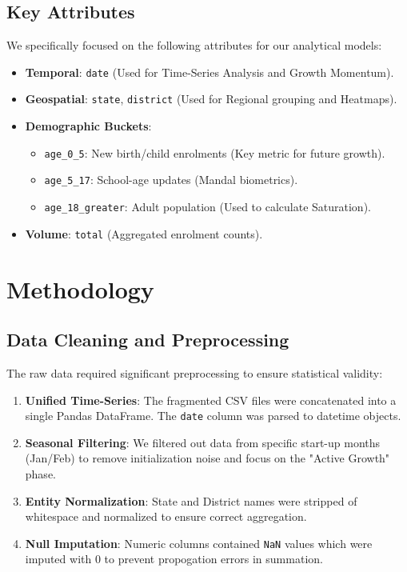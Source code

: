 \documentclass[12pt, a4paper]{article}
\begin{document}
\subsection{Key Attributes}
We specifically focused on the following attributes for our analytical models:
\begin{itemize}
    \item \textbf{Temporal}: \texttt{date} (Used for Time-Series Analysis and Growth Momentum).
    \item \textbf{Geospatial}: \texttt{state}, \texttt{district} (Used for Regional grouping and Heatmaps).
    \item \textbf{Demographic Buckets}:
    \begin{itemize}
        \item \texttt{age\_0\_5}: New birth/child enrolments (Key metric for future growth).
        \item \texttt{age\_5\_17}: School-age updates (Mandal biometrics).
        \item \texttt{age\_18\_greater}: Adult population (Used to calculate Saturation).
    \end{itemize}
    \item \textbf{Volume}: \texttt{total} (Aggregated enrolment counts).
\end{itemize}

\section{Methodology}

\subsection{Data Cleaning and Preprocessing}
The raw data required significant preprocessing to ensure statistical validity:
\begin{enumerate}
    \item \textbf{Unified Time-Series}: The fragmented CSV files were concatenated into a single Pandas DataFrame. The \texttt{date} column was parsed to datetime objects.
    \item \textbf{Seasonal Filtering}: We filtered out data from specific start-up months (Jan/Feb) to remove initialization noise and focus on the "Active Growth" phase.
    \item \textbf{Entity Normalization}: State and District names were stripped of whitespace and normalized to ensure correct aggregation.
    \item \textbf{Null Imputation}: Numeric columns contained \texttt{NaN} values which were imputed with 0 to prevent propogation errors in summation.
\end{enumerate}
\end{document}
